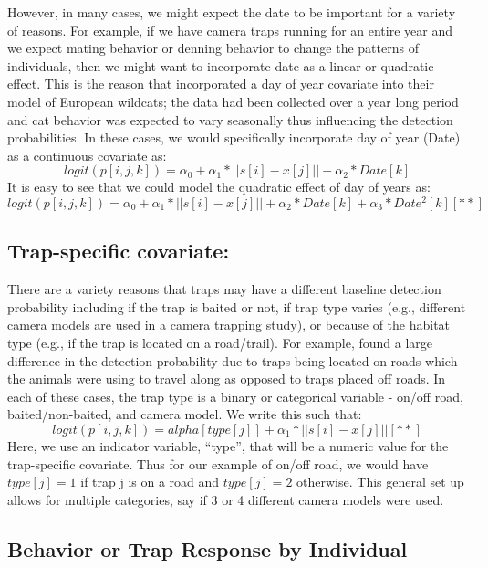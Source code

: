 However, in many cases, we might expect the date to be important for a variety of reasons.  For example, if we have camera traps running for an entire year and we expect mating behavior or denning behavior to change the patterns of individuals, then we might want to incorporate date as a linear or quadratic effect.  This is the reason that \citet{kery_etal:2011} incorporated a day of year covariate into their model of European wildcats; the data had been collected over a year long period and cat behavior was expected to vary seasonally thus influencing the detection probabilities.  In these cases, we would specifically incorporate day of year (Date) as a continuous covariate as:
\[
 	logit(p[i,j,k]) = \alpha_0 + \alpha_1*||s[i]-x[j]|| + \alpha_2*Date[k]  
                   	\]
It is easy to see that we could model the quadratic effect of day of years as:
\[
           logit(p[i,j,k]) = \alpha_0 + \alpha_1*||s[i]-x[j]|| + \alpha_2*Date[k] + \alpha_3*Date^2[k]   [**]
\]


\subsection{Trap-specific covariate:}

There are a variety reasons that traps may have a different baseline
detection probability including if the trap is baited or not, if trap
type varies (e.g., different camera models are used in a camera
trapping study), or because of the habitat type (e.g., if the trap is
located on a road/trail).  For example, \citet{sollmann_etal:2011} found a large difference in the detection probability due to traps being located on roads which the animals were using to travel along as opposed to traps placed off roads.  In each of these cases, the trap type is a binary or categorical variable - on/off road, baited/non-baited, and camera model.   We write this such that:  
                              \[
                                  logit(p[i,j,k]) = alpha[type[j]] + \alpha_1*||s[i]-x[j]||                          [**]
                                  \]
Here, we use an indicator variable, ``type'', that will be a numeric value for the trap-specific covariate.  Thus for our example of on/off road, we would have $type[j] = 1$ if trap j is on a road and $type[j] = 2$ otherwise.  This general set up allows for multiple categories, say if 3 or 4 different camera models were used.  


\subsection{Behavior or Trap Response by Individual}

